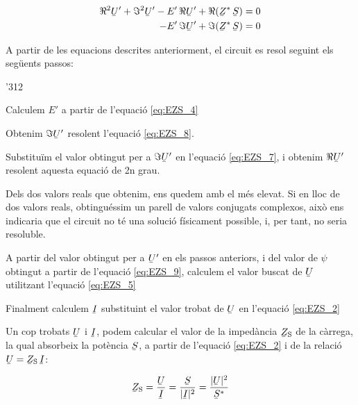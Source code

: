 \begin{align}
   \Re^2\cmplx{U}' + \Im^2\cmplx{U}' - E' \, \Re\cmplx{U}' + \Re(\cmplx{Z}^* \, \cmplx{S}) &= 0 \label{eq:EZS_7} \\
   - E' \, \Im\cmplx{U}' + \Im(\cmplx{Z}^* \, \cmplx{S}) &= 0 \label{eq:EZS_8}
\end{align}

A partir de les equacions descrites anteriorment, el circuit es resol seguint els següents passos:
\begin{dingautolist}{'312}
   \item Calculem $E'$ a partir de l'equació \eqref{eq:EZS_4}
   \item Obtenim $\Im\cmplx{U}'$ resolent l'equació \eqref{eq:EZS_8}.
   \item Substituïm el valor obtingut per a $\Im\cmplx{U}'$ en l'equació \eqref{eq:EZS_7}, i obtenim $\Re\cmplx{U}'$ resolent aquesta equació de 2n grau.
   \item Dels dos valors reals que obtenim, ens quedem amb el més elevat. Si en lloc de dos valors reals, obtinguéssim un parell de valors conjugats complexos, això ens indicaria que el circuit no té una solució físicament possible, i, per tant, no seria resoluble.
   \item A partir del valor  obtingut per a $\cmplx{U}'$ en els passos anteriors, i del valor de $\psi$ obtingut a partir de l'equació \eqref{eq:EZS_9}, calculem el valor buscat de $\cmplx{U}$ utilitzant l'equació \eqref{eq:EZS_5}
   \item Finalment calculem $\cmplx{I}$ substituint el valor trobat de $\cmplx{U}$ en l'equació \eqref{eq:EZS_2}
\end{dingautolist}

Un cop trobats $\cmplx{U}$ i $\cmplx{I}$, podem calcular el valor de
la impedància  $\cmplx{Z}\ped{S}$ de la càrrega, la qual absorbeix
la potència $\cmplx{S}$, a partir de l'equació \eqref{eq:EZS_2} i de
la relació $\cmplx{U} = \cmplx{Z}\ped{S} \,\cmplx{I}$:

\begin{equation}
   \cmplx{Z}\ped{S} = \frac{\cmplx{U}}{\cmplx{I}} =
   \frac{\cmplx{S}}{|\cmplx{I}|^2} =
   \frac{|\cmplx{U}|^2}{\cmplx{S}^*} \label{eq:EZS 10}
\end{equation}


